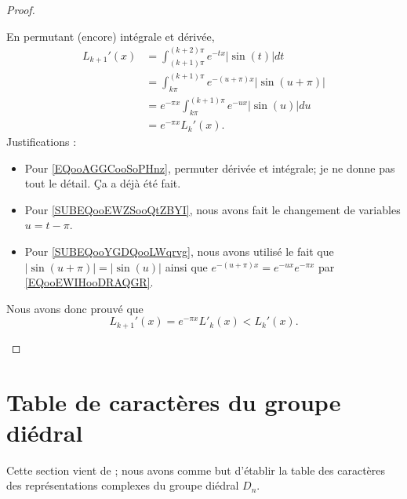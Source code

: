 \begin{proof}
\begin{subproof}
            En permutant (encore) intégrale et dérivée,
            \begin{subequations}
                \begin{align}
                    L_{k+1}'(x)&=\int_{(k+1)\pi}^{(k+2)\pi} e^{-tx}| \sin(t) |dt        \label{EQooAGGCooSoPHnz}\\
                    &=\int_{k\pi}^{(k+1)\pi} e^{-(u+\pi)x}| \sin(u+\pi) |       \label{SUBEQooEWZSooQtZBYI}\\
                    &= e^{-\pi x}\int_{k\pi}^{(k+1)\pi} e^{-ux}| \sin(u) |du    \label{SUBEQooYGDQooLWqrvg}\\
                    &= e^{-\pi x}L_k'(x).
                \end{align}
            \end{subequations}
            Justifications :
            \begin{itemize}
                \item Pour \eqref{EQooAGGCooSoPHnz}, permuter dérivée et intégrale; je ne donne pas tout le détail. Ça a déjà été fait.
                \item Pour \eqref{SUBEQooEWZSooQtZBYI}, nous avons fait le changement de variables \( u=t-\pi\).
                \item Pour \eqref{SUBEQooYGDQooLWqrvg}, nous avons utilisé le fait que \( | \sin(u+\pi) |=| \sin(u) |\) ainsi que \(  e^{-(u+\pi)x}= e^{-ux} e^{-\pi x}\) par \eqref{EQooEWIHooDRAQGR}.
            \end{itemize}
            Nous avons donc prouvé que
            \begin{equation}
                L_{k+1}'(x)= e^{-\pi x}L'_{k}(x)<L_k'(x).
            \end{equation}
    \end{subproof}
\end{proof}

\section{Table de caractères du groupe diédral}
\label{SecWMzheKf}
Cette section vient de \cite{KXjFWKA}; nous avons comme but d'établir la table des caractères des représentations complexes du groupe diédral \( D_n\).


